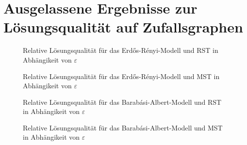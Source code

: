 \documentclass[headsepline,footsepline,footinclude=false,fontsize=11pt,paper=a4,listof=totoc,bibliography=totoc,BCOR=12mm,DIV=12]{scrbook} %
\newcommand{\eps}{\varepsilon}
\begin{document}


\frontmatter{}



%



\tableofcontents{}

\mainmatter{}

\selectfont







\appendix{}
\chapter{Ausgelassene Ergebnisse zur Lösungsqualität auf Zufallsgraphen}\label{chapter:rapp}

\begin{figure}
    \centering
    
    \caption{Relative Lösungsqualität für das Erdős-Rényi-Modell und RST in Abhängikeit von $\eps$}
\end{figure}

\begin{figure}
    \centering
    
    \caption{Relative Lösungsqualität für das Erdős-Rényi-Modell und MST in Abhängikeit von $\eps$}
\end{figure}

\begin{figure}
    \centering
    
    \caption{Relative Lösungsqualität für das Barabási-Albert-Modell und RST in Abhängikeit von $\eps$}
\end{figure}

\begin{figure}
    \centering
    
    \caption{Relative Lösungsqualität für das Barabási-Albert-Modell und MST in Abhängikeit von $\eps$}
\end{figure}

\listoffigures{}
\listoftables{}
\listofalgorithms{}
\lstlistoflistings{}
\printbibliography{}
\end{document}
